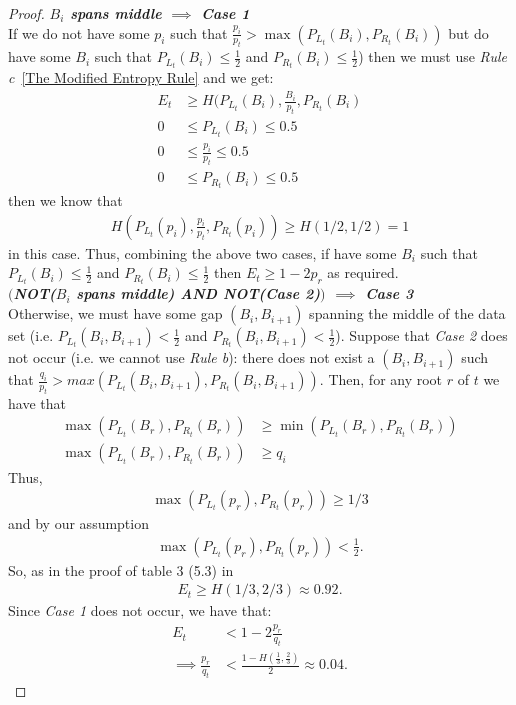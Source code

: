 \documentclass[letterpaper,12pt,titlepage,oneside,final]{book}
\theoremstyle{plain}
\begin{document}
\begin{proof}
\noindent\textbf{\textit{$B_i$ spans middle $\implies$ Case 1}} \\
If we do not have some $p_i$ such that $\frac{p_i}{p_t} > \max(P_{L_t}(B_i), P_{R_t}(B_i))$ but do have some $B_i$ such that $P_{L_t}(B_i) \leq \frac{1}{2}$ and $P_{R_t}(B_i) \leq \frac{1}{2}$) then we must use \textit{Rule c}~\ref{The Modified Entropy Rule} and we get:
\begin{align*}
 E_t &\geq H(P_{L_t}(B_i), \frac{B_i}{p_t} , P_{R_t}(B_i) \\
 0 &\leq P_{L_t}(B_i) \leq 0.5 \\
 0 &\leq \frac{p_i}{p_t} \leq 0.5 \\
 0 &\leq P_{R_t}(B_i) \leq 0.5
\end{align*} 
   then we know that \\
\begin{align*}
H(P_{L_t}(p_i), \frac{p_i}{p_t} , P_{R_t}(p_i)) \geq H(1/2, 1/2) = 1
\end{align*}
in this case.
 Thus, combining the above two cases, if have some $B_i$ such that $P_{L_t}(B_i) \leq \frac{1}{2}$ and $P_{R_t}(B_i) \leq \frac{1}{2}$ then $E_t \geq 1-2p_r$ as required. \\

\noindent\textbf{\textit{$\big($NOT($B_i$ spans middle) AND NOT(Case 2)$\big)$ $\implies$ Case 3}} \\
Otherwise, we must have some gap $(B_i, B_{i+1})$ spanning the middle of the data set (i.e. $P_{L_t}(B_i, B_{i+1}) < \frac{1}{2}$ and $P_{R_t}(B_i, B_{i+1}) < \frac{1}{2}$). Suppose that \textit{Case 2} does not occur (i.e. we cannot use \textit{Rule b}): there does not exist a $(B_i, B_{i+1})$ such that $\frac{q_i}{p_t} > max(P_{L_t}(B_i, B_{i+1}), P_{R_t}(B_i, B_{i+1}))$. Then, for any root $r$ of $t$ we have that \\
\begin{align*}
\max(P_{L_t}(B_r), P_{R_t}(B_r)) &\geq \min(P_{L_t}(B_r), P_{R_t}(B_r))\\ 
\max(P_{L_t}(B_r), P_{R_t}(B_r)) &\geq q_i
\end{align*}
Thus,
\begin{align*}
\max(P_{L_t}(p_r), P_{R_t}(p_r)) \geq 1/3
\end{align*}
 and by our assumption 
\begin{align*}
\max(P_{L_t}(p_r), P_{R_t}(p_r)) < \frac{1}{2}.
\end{align*}
 So, as in the proof of table 3 (5.3) in \cite{guttler1980binary}\\
\begin{align*}
E_t \geq H(1/3, 2/3) \approx 0.92.
\end{align*}
 Since \textit{Case 1} does not occur, we have that:
\begin{align*}
E_t &< 1-2\frac{p_r}{q_t} \\
\implies \frac{p_r}{q_t} &< \frac{1-H(\frac{1}{3}, \frac{2}{3})}{2} \approx 0.04.
\end{align*}


\end{proof}
\end{document}
